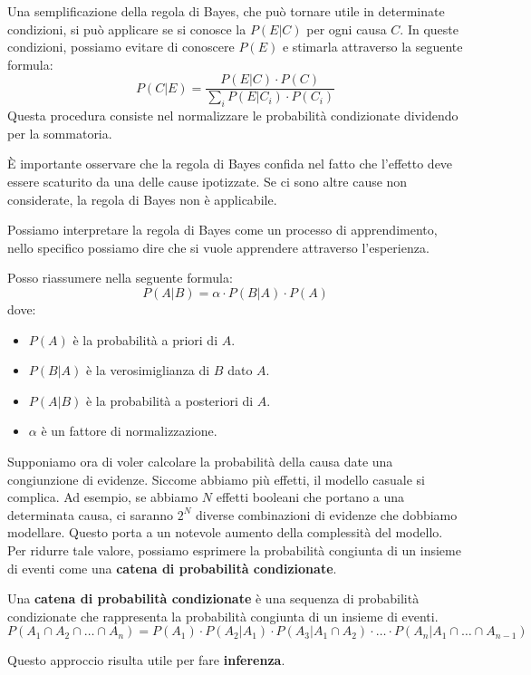 Una semplificazione  della regola di Bayes, che può tornare utile in determinate
condizioni, si può applicare se si conosce la $P(E|C)$ per ogni causa $C$. In
queste condizioni, possiamo evitare di conoscere $P(E)$ e stimarla attraverso la
seguente formula:
\begin{equation}
    P(C|E) = \frac{P(E|C) \cdot P(C)}{\sum_{i} P(E|C_i) \cdot P(C_i)}
\end{equation}
Questa procedura consiste nel normalizzare le probabilità condizionate dividendo
per la sommatoria.
\begin{nota}
    È importante osservare che la regola di Bayes confida nel fatto che l'effetto
    deve essere scaturito da una delle cause ipotizzate. Se ci sono altre
    cause non considerate, la regola di Bayes non è applicabile.
\end{nota}
Possiamo interpretare la regola di Bayes come un processo di apprendimento,
nello specifico possiamo dire che si vuole apprendere attraverso l'esperienza.

Posso riassumere nella seguente formula:
\begin{equation}
    P(A|B) = \alpha \cdot P(B | A) \cdot P(A)
\end{equation}
dove:
\begin{itemize}
    \item $P(A)$ è la probabilità a priori di $A$.
    \item $P(B|A)$ è la verosimiglianza di $B$ dato $A$.
    \item $P(A|B)$ è la probabilità a posteriori di $A$.
    \item $\alpha$ è un fattore di normalizzazione.
\end{itemize}
Supponiamo ora di voler calcolare la probabilità della causa date una congiunzione
di evidenze. Siccome abbiamo più effetti, il modello casuale si complica.
Ad esempio, se abbiamo $N$ effetti booleani che portano a una determinata causa,
ci saranno $2^N$ diverse combinazioni di evidenze che dobbiamo modellare.
Questo porta a un notevole aumento della complessità del modello. Per ridurre
tale valore, possiamo esprimere la probabilità congiunta di un insieme di
eventi come una \textbf{catena di probabilità condizionate}.
\begin{definizione}
    Una \textbf{catena di probabilità condizionate} è una sequenza di probabilità
    condizionate che rappresenta la probabilità congiunta di un insieme di eventi.
    \begin{equation}
        P(A_1 \cap A_2 \cap \ldots \cap A_n) = P(A_1) \cdot P(A_2|A_1) \cdot
        P(A_3|A_1 \cap A_2) \cdot \ldots \cdot P(A_n|A_1 \cap \ldots \cap A_{n-1})
    \end{equation}
\end{definizione}
Questo approccio risulta utile per fare \textbf{inferenza}.

